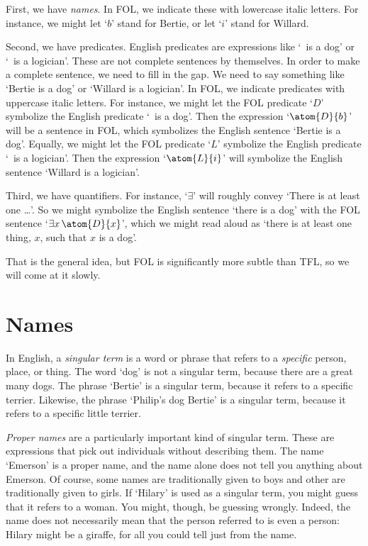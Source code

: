 First, we have \emph{names}. In FOL, we indicate these with lowercase italic letters. For instance, we might let `$b$' stand for Bertie, or let `$i$' stand for Willard.

Second, we have predicates. English predicates are expressions like `\blank\ is a dog' or `\blank\ is a logician'. These are not complete sentences by themselves. In order to make a complete sentence, we need to fill in the gap. We need to say something like `Bertie is a dog' or `Willard is a logician'. In FOL, we indicate predicates with uppercase italic letters. For instance, we might let the FOL predicate `$D$' symbolize the English predicate `\blank\ is a dog'. Then the expression `$\atom{D}{b}$' will be a sentence in FOL, which symbolizes the English sentence `Bertie is a dog'. Equally, we might let the FOL predicate `$L$' symbolize the English predicate `\blank\ is a logician'. Then the expression `$\atom{L}{i}$' will symbolize the English sentence `Willard is a logician'.

Third, we have quantifiers. For instance, `$\exists$' will roughly convey `There is at least one \ldots'. So we might symbolize the English sentence `there is a dog' with the FOL sentence `$\exists x\, \atom{D}{x}$', which we might read aloud as `there is at least one thing, $x$, such that $x$ is a dog'.

That is the general idea, but FOL is significantly more subtle than TFL, so we will come at it slowly.


\section{Names}
In English, a \emph{singular term} is a word or phrase that refers to a \emph{specific} person, place, or thing. The word `dog' is not a singular term, because there are a great many dogs. The phrase `Bertie' is a singular term, because it refers to a specific terrier. Likewise, the phrase `Philip's dog Bertie' is a singular term, because it refers to a specific little terrier.

\emph{Proper names} are a particularly important kind of singular term. These are expressions that pick out individuals without describing them. The name `Emerson' is a proper name, and the name alone does not tell you anything about Emerson. Of course, some names are traditionally given to boys and other are traditionally given to girls. If `Hilary' is used as a singular term, you might guess that it refers to a woman. You might, though, be guessing wrongly. Indeed, the name does not necessarily mean that the person referred to is even a person: Hilary might be a giraffe, for all you could tell just from the name.

